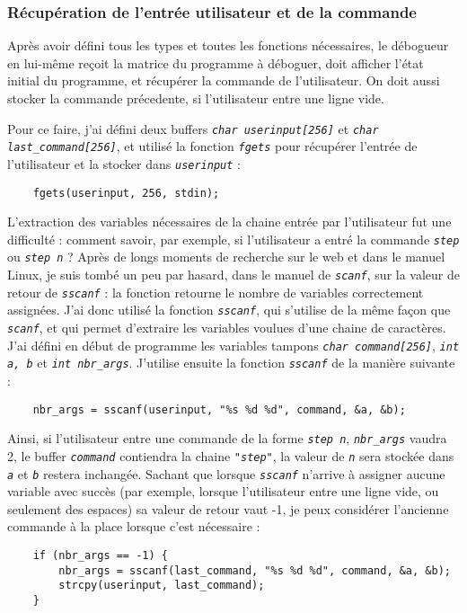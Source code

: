 \documentclass[a4paper,11pt]{article}
\newcommand{\code}[1]{{\itshape\lstinline{#1}}}
\begin{document}
\subsubsection*{Récupération de l'entrée utilisateur et de la commande}

Après avoir défini tous les types et toutes les fonctions nécessaires, le débogueur en lui-même reçoit la matrice du programme à déboguer, doit afficher l'état initial du programme, et récupérer la commande de l'utilisateur. On doit aussi stocker la commande précedente, si l'utilisateur entre une ligne vide.

Pour ce faire, j'ai défini deux buffers \code{char userinput[256]} et \code{char last_command[256]}, et utilisé la fonction \code{fgets} pour récupérer l'entrée de l'utilisateur et la stocker dans \code{userinput} :
\begin{lstlisting}
    fgets(userinput, 256, stdin);
\end{lstlisting}

L'extraction des variables nécessaires de la chaine entrée par l'utilisateur fut une difficulté : comment savoir, par exemple, si l'utilisateur a entré la commande \code{step} ou \code{step n} ? Après de longs moments de recherche sur le web et dans le manuel Linux, je suis tombé un peu par hasard, dans le manuel de \code{scanf}, sur la valeur de retour de \code{sscanf} : la fonction retourne le nombre de variables correctement assignées.
J'ai donc utilisé la fonction \code{sscanf}, qui s'utilise de la même façon que \code{scanf}, et qui permet d'extraire les variables voulues d'une chaine de caractères. J'ai défini en début de programme les variables tampons \code{char command[256]}, \code{int a, b} et \code{int nbr_args}. J'utilise ensuite la fonction \code{sscanf} de la manière suivante :
{\small\begin{lstlisting}
    nbr_args = sscanf(userinput, "%s %d %d", command, &a, &b);
\end{lstlisting}}

Ainsi, si l'utilisateur entre une commande de la forme \code{step n}, \code{nbr_args} vaudra 2, le buffer \code{command} contiendra la chaine \code{"step"}, la valeur de \code{n} sera stockée dans \code{a} et \code{b} restera inchangée.
Sachant que lorsque \code{sscanf} n'arrive à assigner aucune variable avec succès (par exemple, lorsque l'utilisateur entre une ligne vide, ou seulement des espaces) sa valeur de retour vaut -1, je peux considérer l'ancienne commande à la place lorsque c'est nécessaire :
{\small\begin{lstlisting}
    if (nbr_args == -1) {
        nbr_args = sscanf(last_command, "%s %d %d", command, &a, &b);
        strcpy(userinput, last_command);
    }
\end{lstlisting}}
\end{document}
